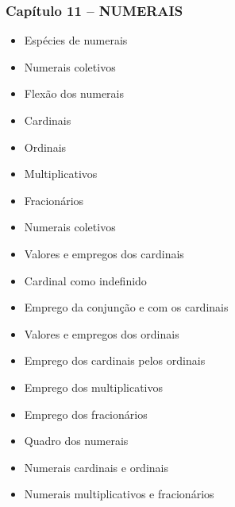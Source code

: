 \documentclass[a4paper,12pt]{article}[abntex2]
\begin{document}
\subsubsection*{Capítulo 11 – NUMERAIS}
\begin{itemize}
    \item Espécies de numerais
    \item Numerais coletivos
    \item Flexão dos numerais
    \item Cardinais
    \item Ordinais
    \item Multiplicativos
    \item Fracionários
    \item Numerais coletivos
    \item Valores e empregos dos cardinais
    \item Cardinal como indefinido
    \item Emprego da conjunção e com os cardinais
    \item Valores e empregos dos ordinais
    \item Emprego dos cardinais pelos ordinais
    \item Emprego dos multiplicativos
    \item Emprego dos fracionários
    \item Quadro dos numerais
    \item Numerais cardinais e ordinais
    \item Numerais multiplicativos e fracionários
\end{itemize}
\end{document}
